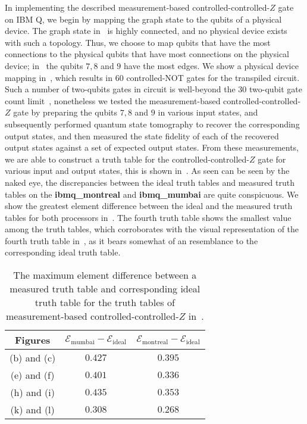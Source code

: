 \bigskip
\noindent
In implementing the described measurement-based controlled-controlled-$Z$ gate on IBM Q, we begin by mapping the graph state to the qubits of a physical device. The graph state in~ is highly connected, and no physical device exists with such a topology. Thus, we choose to map qubits that have the most connections to the physical qubits that have most connections on the physical device; in~ the qubits $7,8$ and $9$ have the most edges. We show a physical device mapping in~, which results in $60$ controlled-NOT gates for the transpiled circuit. Such a number of two-qubits gates in circuit is well-beyond the $30$ two-qubit gate count limit~\cite{Gwinner_2020}, nonetheless we tested the measurement-based controlled-controlled-$Z$ gate by preparing the qubits $7,8$ and $9$ in various input states, and subsequently performed quantum state tomography to recover the corresponding output states, and then measured the state fidelity of each of the recovered output states against a set of expected output states. From these measurements, we are able to construct a truth table for the controlled-controlled-$Z$ gate for various input and output states, this is shown in~. As seen can be seen by the naked eye, the discrepancies between the ideal truth tables and measured truth tables on the \textbf{ibmq\_montreal} and \textbf{ibmq\_mumbai} are quite conspicuous.  We show the greatest element difference between the ideal and the measured truth tables for both processors in~. The fourth truth table shows the smallest value among the truth tables, which corroborates with the visual representation of the fourth truth table in~, as it bears somewhat of an resemblance to the corresponding ideal truth table. 

\begin{table}[h!]
	\centering
	\caption[The maximum element difference between a measure truth table and corresponding ideal truth table for the truth tables of measurement-based controlled-controlled-$Z$ in~\protect{}.]{The maximum element difference between a measured truth table and corresponding ideal truth table for the truth tables of measurement-based controlled-controlled-$Z$ in~\protect{}. }
	\begin{tabular}{ccc}
		\toprule
		 Figures & $\mathcal{E}_\text{mumbai} - \mathcal{E}_\text{ideal}$ & $\mathcal{E}_\text{montreal} - \mathcal{E}_\text{ideal}$ \\
		\toprule
		(b) and (c)  & $0.427$      &  $0.395$ \\
		(e) and (f)  & $0.401$      &  $0.336$ \\ 
		(h) and (i)  & $0.435$      &  $0.353$ \\
		(k) and (l)  & $0.308$      &  $0.268$ \\
		\toprule
	\end{tabular}
\end{table}

